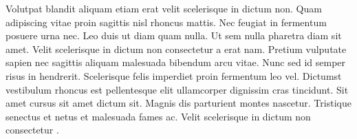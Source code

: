 \documentclass[a4paper]{article}
\begin{document}
Volutpat blandit aliquam etiam erat velit scelerisque in dictum non. Quam adipiscing vitae proin sagittis nisl rhoncus mattis. Nec feugiat in fermentum posuere urna nec. Leo duis ut diam quam nulla. Ut sem nulla pharetra diam sit amet. Velit scelerisque in dictum non consectetur a erat nam. Pretium vulputate sapien nec sagittis aliquam malesuada bibendum arcu vitae. Nunc sed id semper risus in hendrerit. Scelerisque felis imperdiet proin fermentum leo vel. Dictumst vestibulum rhoncus est pellentesque elit ullamcorper dignissim cras tincidunt. Sit amet cursus sit amet dictum sit. Magnis dis parturient montes nascetur. Tristique senectus et netus et malesuada fames ac. Velit scelerisque in dictum non consectetur \autocite[100]{social-death}.

\printbibliography{}
\end{document}
